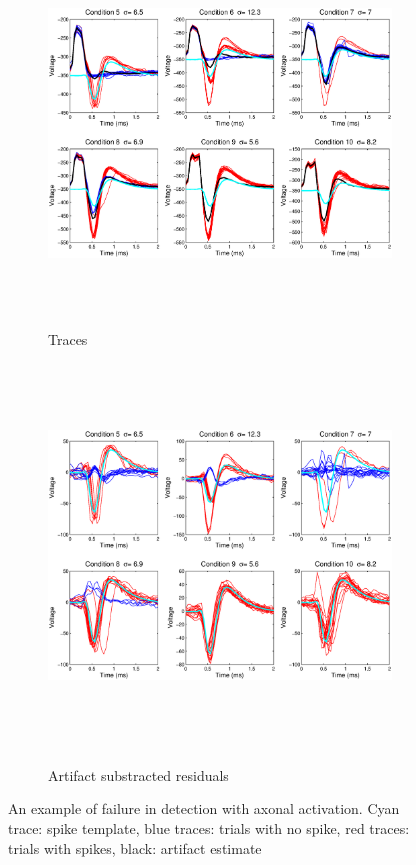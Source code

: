 \documentclass[12pt,letterpaper,fleqn]{article}
\begin{document}
 \begin{figure}[h!]
        \centering
        \begin{subfigure}[b]{\textwidth}
                \includegraphics[height=4in]{TracesEl170pattern1443.eps}
   \caption{Traces}
                \label{fig:gull}
        \end{subfigure}%
\centering

\begin{subfigure}[b]{\textwidth}
                \includegraphics[height=4in]{ResidualsEl170pattern1443.eps}
                \label{fig:tiger}
                \caption{Artifact substracted residuals}
        \end{subfigure}
\caption{An example of failure in detection with axonal activation. Cyan trace: spike template, blue traces: trials with no spike, red traces: trials with spikes, black: artifact estimate}
\end{figure}

  



    
\end{document}
